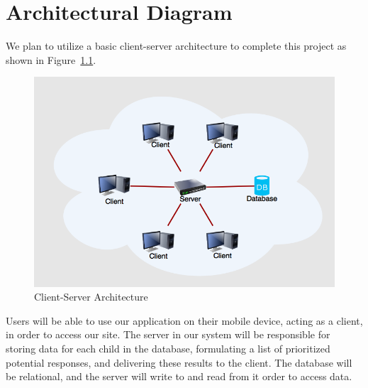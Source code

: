 \chapter{Architectural Diagram}

We plan to utilize a basic client-server architecture to complete this project as shown in Figure~\ref{fig:arch}.

\begin{figure}[htb]
\centering
\includegraphics[width=\textwidth]{arch.png}
\caption{Client-Server Architecture}
\label{fig:arch}
\end{figure}

Users will be able to use our application on their mobile device, acting as a client, in order to access our site. The server in our system will be responsible for storing data for each child in the database, formulating a list of prioritized potential responses, and delivering these results to the client. The database will be relational, and the server will write to and read from it order to access data.